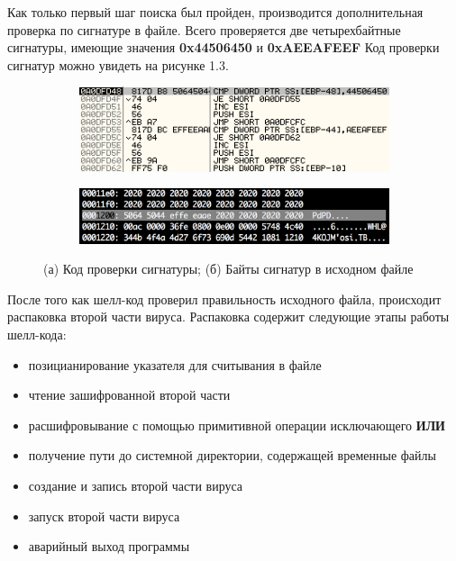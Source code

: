 Как только первый шаг поиска был пройден, производится дополнительная проверка по сигнатуре в файле.
Всего проверяется две четырехбайтные сигнатуры, имеющие значения \textbf{0x44506450} и \textbf{0xAEEAFEEF}
Код проверки сигнатур можно увидеть на рисунке 1.3.

\begin{figure}[ht]
    \centering
    \begin{subfigure}[h]{0.6\textwidth}
    \centering
        \includegraphics[scale=0.7]{1.pdf/pasted-image-25.png}
        \caption{}
        \vspace*{5mm}
    \end{subfigure}
    \begin{subfigure}[h]{0.6\textwidth}
    \centering
        \includegraphics[scale=0.7]{1.pdf/pasted-image-27.png}
        \caption{}
    \end{subfigure}
    \caption{(а) Код проверки сигнатуры; (б) Байты сигнатур в исходном файле}
    \label{fig_parsetree}
\end{figure}

После того как шелл-код проверил правильность исходного файла, происходит распаковка второй части вируса.
Распаковка содержит следующие этапы работы шелл-кода:
\begin{itemize}
\item позицианирование указателя для считывания в файле
\item чтение зашифрованной второй части
\item расшифровывание с помощью примитивной операции исключающего \textbf{ИЛИ}
\item получение пути до системной директории, содержащей временные файлы
\item создание и запись второй части вируса
\item запуск второй части вируса
\item аварийный выход программы
\end{itemize}

